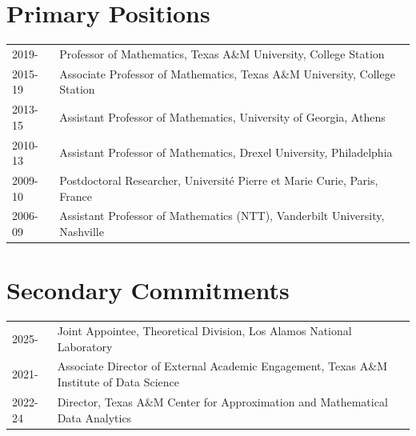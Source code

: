 \documentclass[11pt]{article}
\begin{document}
\section{Primary Positions}
\begin{tabular}{ll}

2019- & Professor of Mathematics, Texas A\&M University, College Station\\
2015-19 & Associate Professor of Mathematics, Texas A\&M University, College Station\\
2013-15 & Assistant Professor of Mathematics, University of Georgia, Athens\\
2010-13 & Assistant Professor of Mathematics,  Drexel University, Philadelphia\\
2009-10 & Postdoctoral Researcher,  Universit\'{e} Pierre et Marie Curie, Paris, France\\
2006-09 & Assistant Professor of Mathematics (NTT),  Vanderbilt University, Nashville
\end{tabular}


\section{Secondary Commitments} %
\begin{tabular}{ll}
2025-  & Joint Appointee,  Theoretical Division, Los Alamos National Laboratory\\
2021-  & Associate Director of External Academic Engagement, Texas A\&M Institute of Data Science\\
2022-24 & Director, Texas A\&M Center for Approximation and Mathematical Data Analytics
\end{tabular}
\end{document}
